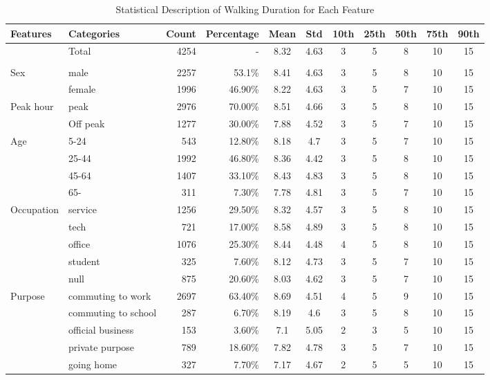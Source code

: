 \documentclass[Journal,letterpaper]{ascelike-new}
\begin{document}
\begin{table}[htbp]
\caption{Statistical Description of Walking Duration for Each Feature}
\label{table:2}
\centering
\small
\renewcommand{\arraystretch}{1.25}
\begin{tabular}{llrrccccccc}
\hline\hline
Features & Categories & Count & Percentage & Mean & Std & 10th & 25th & 50th & 75th & 90th\\
\hline
 & Total    & 4254  & -         & 8.32  & 4.63  & 3     & 5     & 8     & 10    & 15 \\
 &          &       &           &       &       &       &       &       &       & \\
%
\multicolumn{1}{l}{Sex}
 & male     & 2257  & 53.1\%    & 8.41  & 4.63  & 3     & 5     & 8     & 10    & 15 \\
 & female   & 1996  & 46.90\%   & 8.22  & 4.63  & 3     & 5     & 7     & 10    & 15 \\
%
\multicolumn{1}{l}{Peak hour}
 & peak     & 2976  & 70.00\%   & 8.51  & 4.66  & 3     & 5     & 8     & 10    & 15 \\
 & Off peak & 1277  & 30.00\%   & 7.88  & 4.52  & 3     & 5     & 7     & 10    & 15 \\
%
 \multicolumn{1}{l}{Age}
 & 5-24     & 543   & 12.80\%   & 8.18  & 4.7   & 3     & 5     & 7     & 10    & 15 \\
 & 25-44    & 1992  & 46.80\%   & 8.36  & 4.42  & 3     & 5     & 8     & 10    & 15 \\
 & 45-64    & 1407  & 33.10\%   & 8.43  & 4.83  & 3     & 5     & 8     & 10    & 15 \\
 & 65-      & 311   &  7.30\%   & 7.78  & 4.81  & 3     & 5     & 7     & 10    & 15 \\
%
 \multicolumn{1}{l}{Occupation}
 & service  & 1256  & 29.50\%   & 8.32  & 4.57  & 3     & 5     & 8     & 10    & 15 \\
 & tech     & 721   & 17.00\%   & 8.58  & 4.89  & 3     & 5     & 8     & 10    & 15 \\
 & office   & 1076  & 25.30\%   & 8.44  & 4.48  & 4     & 5     & 8     & 10    & 15 \\
 & student  & 325   &  7.60\%   & 8.12  & 4.73  & 3     & 5     & 7     & 10    & 15 \\
 & null     & 875   & 20.60\%   & 8.03  & 4.62  & 3     & 5     & 7     & 10    & 15 \\
%
 \multicolumn{1}{l}{Purpose}
 & commuting to work   & 2697  & 63.40\% & 8.69  & 4.51  & 4     & 5     & 9     & 10    & 15 \\
 & commuting to school & 287   &  6.70\% & 8.19  & 4.6   & 3     & 5     & 8     & 10    & 15 \\
 & official business   & 153   &  3.60\% & 7.1   & 5.05  & 2     & 3     & 5     & 10    & 15 \\
 & private purpose     & 789   & 18.60\% & 7.82  & 4.78  & 3     & 5     & 7     & 10    & 15 \\
 & going home          & 327   &  7.70\% & 7.17  & 4.67  & 2     & 5     & 5     & 10    & 15 \\
%
\hline\hline
\end{tabular}
\normalsize
\end{table}
%
\end{document}
